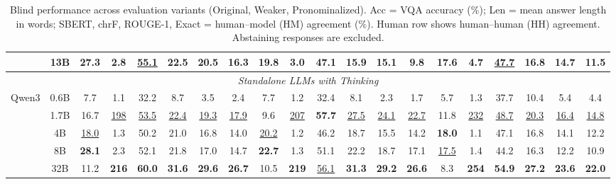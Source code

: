 \begin{table}[t]
{\begin{tabular}{lc|cccccc|cccccc|cccccc}
 & 13B & 27.3 & 2.8 & \underline{55.1} & 22.5 & 20.5 & 16.3 & 19.8 & 3.0 & 47.1 & 15.9 & 15.1 & 9.8 & 17.6 & 4.7 & \underline{47.7} & 16.8 & 14.7 & 11.5 \\
\midrule
\multicolumn{20}{c}{\textit{Standalone LLMs with Thinking}} \\
\midrule
\multirow{5}{*}{Qwen3} & 0.6B & 7.7 & 1.1 & 32.2 & 8.7 & 3.5 & 2.4 & 7.7 & 1.2 & 32.4 & 8.1 & 2.3 & 1.7 & 5.7 & 1.3 & 37.7 & 10.4 & 5.4 & 4.4 \\
 & 1.7B & 16.7 & \underline{198} & \underline{53.5} & \underline{22.4} & \underline{19.3} & \underline{17.9} & 9.6 & \underline{207} & \textbf{57.7} & \underline{27.5} & \underline{24.1} & \underline{22.7} & 11.8 & \underline{232} & \underline{48.7} & \underline{20.3} & \underline{16.4} & \underline{14.8} \\
 & 4B & \underline{18.0} & 1.3 & 50.2 & 21.0 & 16.8 & 14.0 & \underline{20.2} & 1.2 & 46.2 & 18.7 & 15.5 & 14.2 & \textbf{18.0} & 1.1 & 47.1 & 16.8 & 14.1 & 12.2 \\
 & 8B & \textbf{28.1} & 2.3 & 52.1 & 21.8 & 17.0 & 14.7 & \textbf{22.7} & 1.3 & 51.1 & 22.2 & 18.7 & 17.1 & \underline{17.5} & 1.4 & 44.2 & 16.3 & 12.2 & 10.9 \\
 & 32B & 11.2 & \textbf{216} & \textbf{60.0} & \textbf{31.6} & \textbf{29.6} & \textbf{26.7} & 10.5 & \textbf{219} & \underline{56.1} & \textbf{31.3} & \textbf{29.2} & \textbf{26.6} & 8.3 & \textbf{254} & \textbf{54.9} & \textbf{27.2} & \textbf{23.6} & \textbf{22.0} \\
\bottomrule
\end{tabular}
}
\caption{\small Blind performance across evaluation variants (Original, Weaker, Pronominalized). Acc = VQA accuracy (\%); Len = mean answer length in words; SBERT, chrF, ROUGE-1, Exact = human--model (HM) agreement (\%). Human row shows human--human (HH) agreement. Abstaining responses are excluded.}
\label{tab:comprehensive_inst_blind_w5_filtered}
\end{table}
